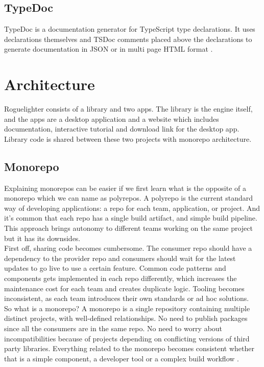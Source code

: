 \documentclass{article}
\begin{document}
\subsection{TypeDoc}
TypeDoc is a documentation generator for TypeScript type declarations. It uses declarations themselves and TSDoc comments placed above the declarations to generate documentation in JSON or in multi page HTML format \cite{typedoc}.

\section{Architecture}
Roguelighter consists of a library and two apps. The library is the engine itself, and the apps are a desktop application and a website which includes documentation, interactive tutorial and download link for the desktop app. Library code is shared between these two projects with monorepo architecture.

\subsection{Monorepo}
Explaining monorepos can be easier if we first learn what is the opposite of a monorepo which we can name as polyrepos. A polyrepo is the current standard way of developing applications: a repo for each team, application, or project. And it's common that each repo has a single build artifact, and simple build pipeline. This approach brings autonomy to different teams working on the same project but it has its downsides.\\

First off, sharing code becomes cumbersome. The consumer repo should have a dependency to the provider repo and consumers should wait for the latest updates to go live to use a certain feature. Common code patterns and components gets implemented in each repo differently, which increases the maintenance cost for each team and creates duplicate logic. Tooling becomes inconsistent, as each team introduces their own standards or ad hoc solutions.\\

So what is a monorepo? A monorepo is a single repository containing multiple distinct projects, with well-defined relationships. No need to publish packages since all the consumers are in the same repo. No need to worry about incompatibilities because of projects depending on conflicting versions of third party libraries. Everything related to the monorepo becomes consistent whether that is a simple component, a developer tool or a complex build workflow \cite{monorepo}.
\end{document}
